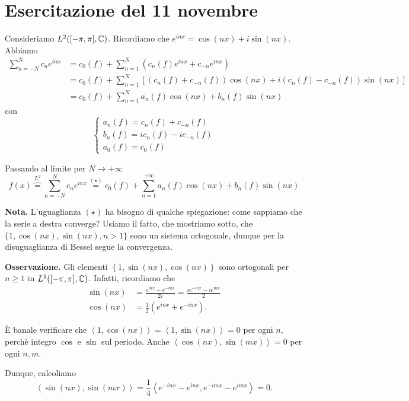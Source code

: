%
%

\section{Esercitazione del 11 novembre}

Consideriamo $L^2([-\pi,\pi], \mathbb C) $. Ricordiamo che $e^{inx} = \cos(nx) + i \sin(nx)$. 
Abbiamo
%
\begin{align*}
\sum_{n=-N}^N c_n e^{inx} & = c_0(f) + \sum_{n=1}^N \left( c_n(f) e^{inx} + c_{-n} e^{inx} \right) \\
& = c_0(f) + \sum_{n=1}^{N} \left[ \left( c_n(f) + c_{-n}(f) \right) \cos(nx) + i\left( c_n(f) - c_{-n}(f) \right) \sin(nx) \right] \\
& = c_0(f) + \sum_{n=1}^{N} a_n(f) \cos(nx) + b_n(f) \sin(nx)  
\end{align*}
con
%
$$
\begin{cases}
a_n(f) = c_n(f) + c_{-n}(f) \\
b_n(f) = i c_n(f) - i c_{-n} (f) \\
a_0(f) = c_0(f)
\end{cases} 
$$
%

Passando al limite per $N \to +\infty$
%
$$
f(x) \overbrace{=}^{L^2} \sum_{n=-N}^N c_n e^{inx} 
\overset{(\star)}{=} c_0(f) + \sum_{n=1}^{+\infty} a_n(f) \cos(nx) + b_n(f) \sin(nx) 
$$
%

\textbf{Nota.} L'uguaglianza $(\star)$ ha bisogno di qualche spiegazione: come sappiamo che la serie a destra converge? Usiamo il fatto, che mostriamo sotto, che $\{1, \cos(nx), \sin(nx), n > 1 \}$ sono un sistema ortogonale, dunque per la disuguaglianza di Bessel segue la convergenza.

\textbf{Osservazione.} Gli elementi $\left\{ 1, \sin(nx), \cos(nx) \right\}$ sono ortogonali per $n \geq 1$ in $L^2([-\pi,\pi], \mathbb C) $.
Infatti, ricordiamo che
\begin{align*}
\sin(nx) & = \frac{e^{inx} - e^{-inx}}{2i} = \frac{i e^{-inx} - i e^{inx}}{2} \\
\cos(nx) & = \frac{1}{2} \left( e^{inx} + e^{-inx} \right).
\end{align*}

È banale verificare che $\left<1,\cos(nx) \right> = \left<1, \sin(nx) \right> = 0$ per ogni  $n$, perchè integro $\cos$ e $\sin$ sul periodo. Anche $\left<\cos(nx), \sin(mx) \right> = 0$ per ogni $n,m$.

Dunque, calcoliamo
%
$$
\left<\sin(nx), \sin(mx) \right> = \frac{1}{4} \left<e^{-inx} - e^{inx}, e^{-imx} - e^{imx} \right> = 0.
$$
%

